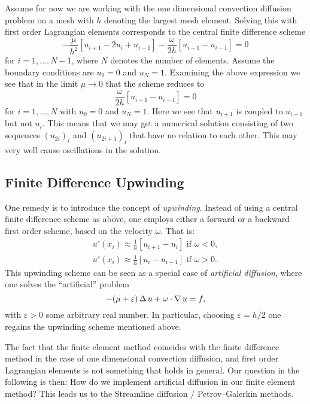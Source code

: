 Assume for now we are working with the one dimensional convection diffusion
problem on a mesh with \( h \) denoting the largest mesh element. Solving this
with first order Lagrangian elements corresponds to the central finite
difference scheme
\begin{equation}
    -\frac{\mu}{h^2} [u_{i+1} - 2u_i + u_{i-1}] - \frac{\omega}{2h} [u_{i+1} - u_{i-1}] = 0
\end{equation}
for \( i = 1, \ldots, N-1 \), where \( N \) denotes the number of elements.
Assume the boundary conditions are \( u_0 = 0 \) and \( u_N = 1\). Examining
the above expression we see that in the limit \( \mu \to 0 \) that the scheme
reduces to
\begin{equation}
    \frac{\omega}{2h}[u_{i+1} - u_{i - 1}] = 0
\end{equation}
for \(i = 1, \dots, N\) with \(u_0 = 0\) and \(u_N = 1 \). Here we see that \(
u_{i+1} \) is coupled to \( u_{i-1} \) but not \( u_i \). This means that we
may get a numerical solution consisting of two sequences \((u_{2i})_i\) and
\((u_{2i+1})_i\) that have no relation to each other. This may very well cause
oscillations in the solution.

\subsection{Finite Difference Upwinding}

One remedy is to introduce the concept of \emph{upwinding}. Instead of using a
central finite difference scheme as above, one employs either a forward or a backward
first order scheme, based on the velocity \( \omega\). That is:
\begin{align}
    u'(x_i) \approx \frac{1}{h}[u_{i+1} - u_i] \text{ if } \omega < 0, \\
    u'(x_i) \approx \frac{1}{h}[u_{i} - u_{i-1}] \text{ if } \omega > 0.
\end{align}
This upwinding scheme can be seen as a special case of \emph{artificial
diffusion}, where one solves the ``artificial'' problem
\begin{equation}
    -(\mu + \varepsilon)\operatorname{\mathop{}\!\Delta} u + \omega \cdot \operatorname{\mathop{}\!\nabla} u = f,
\end{equation}
with \( \varepsilon > 0 \) some arbitrary real number. In particular, choosing
\( \varepsilon = h / 2 \) one regains the upwinding scheme mentioned above.

The fact that the finite element method coincides with the finite difference
method in the case of one dimensional convection diffusion, and first order
Lagrangian elements is not something that holds in general. Our question in the
following is then: How do we implement artificial diffusion in our finite
element method? This leads us to the Streamline diffusion / Petrov--Galerkin
methods.

